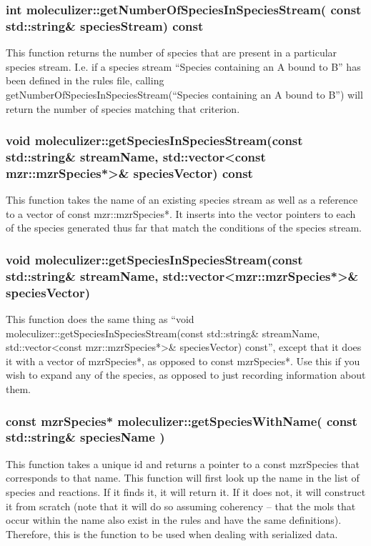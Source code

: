 \subsubsection{int moleculizer::getNumberOfSpeciesInSpeciesStream(
  const std::string\& speciesStream) const}

This function returns the number of species that are present in a
particular species stream.  I.e. if a species stream ``Species
containing an A bound to B'' has been defined in the rules file,
calling getNumberOfSpeciesInSpeciesStream(``Species containing an A
bound to B'') will return the number of species matching that criterion.

\subsubsection{void moleculizer::getSpeciesInSpeciesStream(const
  std::string\& streamName, std::vector<const mzr::mzrSpecies*>\&
  speciesVector) const }

This function takes the name of an existing species stream as well as
a reference to a vector of const mzr::mzrSpecies*.  It inserts into
the vector pointers to each of the species generated thus far that
match the conditions of the species stream.

\subsubsection{void moleculizer::getSpeciesInSpeciesStream(const
  std::string\& streamName, std::vector<mzr::mzrSpecies*>\&
  speciesVector) }

This function does the same thing as ``void
moleculizer::getSpeciesInSpeciesStream(const std::string\& streamName,
std::vector<const mzr::mzrSpecies*>\& speciesVector) const'', except
that it does it with a vector of mzrSpecies*, as opposed to const
mzrSpecies*.  Use this if you wish to expand any of the species, as
opposed to just recording information about them.

\subsubsection{const mzrSpecies* moleculizer::getSpeciesWithName(
  const std::string\& speciesName )}
This function takes a unique id and returns a pointer to a const
mzrSpecies that corresponds to that name.  This function will first
look up the name in the list of species and reactions.  If it finds
it, it will return it.  If it does not, it will construct it from
scratch (note that it will do so assuming coherency -- that the mols
that occur within the name also exist in the rules and have the same
definitions).  Therefore, this is the function to be used when dealing
with serialized data.  

